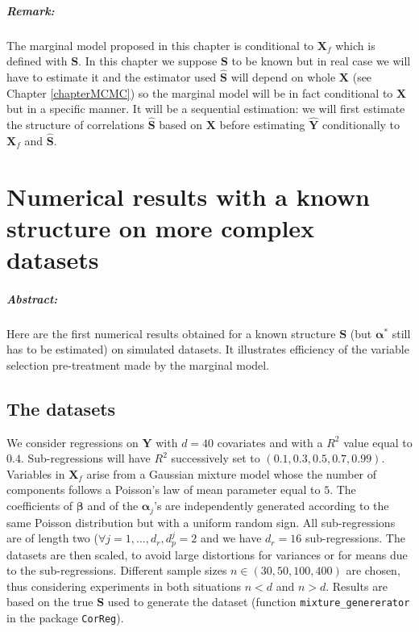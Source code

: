 \documentclass[12pt,a4paper]{report}
\begin{document}
\paragraph{Remark:} The marginal model proposed in this chapter is conditional to $\boldsymbol{X}_f$ which is defined with $\boldsymbol{S}$. In this chapter we suppose $\boldsymbol{S}$ to be known but in real case we will have to estimate it and the estimator used $\hat{\boldsymbol{S}}$ will depend on whole $\boldsymbol{X}$ (see Chapter \ref{chapterMCMC}) so the marginal model will be in fact conditional to $\boldsymbol{X}$ but in a specific manner. It will be a sequential estimation: we will first estimate the structure of correlations $\hat{\boldsymbol{S}}$ based on $\boldsymbol{X}$ before estimating $\hat{\boldsymbol{Y}}$ conditionally to $\boldsymbol{X}_f$ and $\hat{\boldsymbol{S}}$.		
		
\chapter{Numerical results with a known structure on more complex datasets}	\label{chaptersimulexpl}
\paragraph{Abstract:} Here are the first numerical results obtained for a known structure $\boldsymbol{S}$ (but $\boldsymbol{\alpha}^* $ still has to be estimated) on simulated datasets. It illustrates efficiency of the variable selection pre-treatment made by the marginal model.
		 
	
	\section{The datasets}\label{thedatasets}
		
We consider regressions on $\boldsymbol{Y}$ with $d=40$ covariates and with a $R^2$ value equal to $0.4$. Sub-regressions will have $R^2$ successively set to $(0.1,0.3,0.5,0.7,0.99)$. Variables in $\boldsymbol{X}_f$ arise from a Gaussian mixture model whose the number of components follows a Poisson's law of mean parameter equal to $5$. The coefficients of $\boldsymbol{\beta}$ and of the $\boldsymbol{\alpha}_j$'s are independently generated according to the same Poisson distribution but with a uniform random sign. All sub-regressions are of length two ($\forall j=1,\ldots,d_r, d_p^j=2$ and we have $d_r=16$ sub-regressions. The datasets are then scaled, to avoid large distortions for variances or for means due to the sub-regressions.	Different sample sizes  $n\in (30,50,100,400)$ are chosen, thus considering experiments in both situations $n<d$ and $n>d$. 
	Results are based on the true $\boldsymbol{S}$ used to generate the dataset (function {\tt mixture\_genererator} in the package {\tt CorReg}).\\
	
\end{document}
